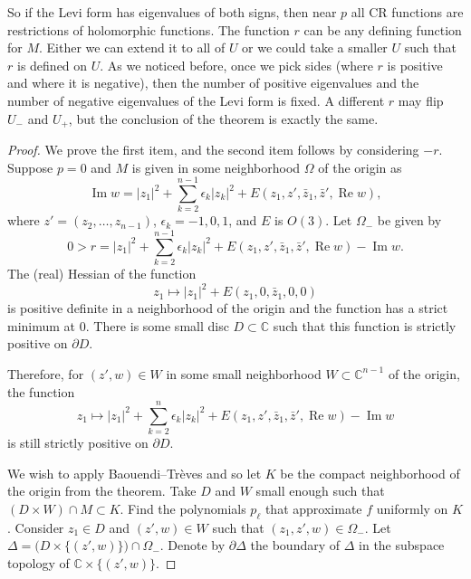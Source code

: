\documentclass[12pt,openany]{book}
\renewcommand{\Re}{\operatorname{Re}}
\renewcommand{\Im}{\operatorname{Im}}
\newcommand{\sabs}[1]{\lvert {#1} \rvert}
\newcommand{\C}{{\mathbb{C}}}
\theoremstyle{plain}
\theoremstyle{remark}
\theoremstyle{definition}
\theoremstyle{exercise}
\theoremstyle{example}
\begin{document}
So if the Levi form has eigenvalues of both signs,
then near $p$ all CR functions are restrictions of holomorphic
functions.
The function $r$ can be any defining
function for $M$.  Either we can extend it to all of $U$ or we could take a
smaller $U$ such that $r$ is defined on $U$.  As we noticed before,
once we pick sides (where $r$ is positive and where it is negative), then
the number of positive eigenvalues and the number of negative eigenvalues of
the Levi form is fixed.  A different $r$ may flip $U_-$
and $U_+$, but the conclusion of the theorem is exactly the same.

\begin{proof}
We prove the first item, and the second item follows by considering $-r$.
Suppose $p = 0$ and $M$ is given in some neighborhood
$\Omega$ of the origin as
\begin{equation*}
\Im w = \sabs{z_1}^2 + \sum_{k=2}^{n-1} \epsilon_k \sabs{z_k}^2 +
E(z_1,z',\bar{z}_1,\bar{z}',\Re w) ,
\end{equation*}
where $z' = (z_2,\ldots,z_{n-1})$, $\epsilon_k = -1,0,1$,
and $E$ is $O(3)$.
Let $\Omega_-$ be given by
\begin{equation*}
0 > r = \sabs{z_1}^2 + \sum_{k=2}^{n-1} \epsilon_k \sabs{z_k}^2 +
E(z_1,z',\bar{z}_1,\bar{z}',\Re w) - \Im w .
\end{equation*}
The (real) Hessian of the function
\begin{equation*}
z_1 \mapsto \sabs{z_1}^2 +
E(z_1,0,\bar{z}_1,0,0)
\end{equation*}
is positive definite in a
neighborhood of the origin and the function has a strict minimum at $0$.
There is some small disc $D \subset \C$ such
that this function is strictly positive on $\partial D$.

Therefore, for $(z',w) \in W$ in some
small neighborhood $W \subset \C^{n-1}$ of the origin,
the function
\begin{equation*}
z_1 \mapsto \sabs{z_1}^2 + \sum_{k=2}^n \epsilon_k \sabs{z_k}^2 +
E(z_1,z',\bar{z}_1,\bar{z}',\Re w) - \Im w
\end{equation*}
is still strictly positive on $\partial D$.

We wish to apply
Baouendi--Tr{\`e}ves and so let $K$ be the compact neighborhood of the
origin from the theorem.  Take $D$ and $W$ small enough such
that $(D \times W) \cap M \subset K$.
Find the polynomials $p_\ell$ that approximate $f$ uniformly on $K$.
Consider $z_1 \in D$ and $(z',w) \in W$ such that
$(z_1,z',w) \in \Omega_-$.
Let
$\Delta = \bigl( D \times \{ (z',w) \} \bigr) \cap \Omega_-$.
Denote by $\partial \Delta$ the boundary of $\Delta$ in the subspace topology
of $\C \times \{ (z',w) \}$.


\end{proof}
\end{document}
